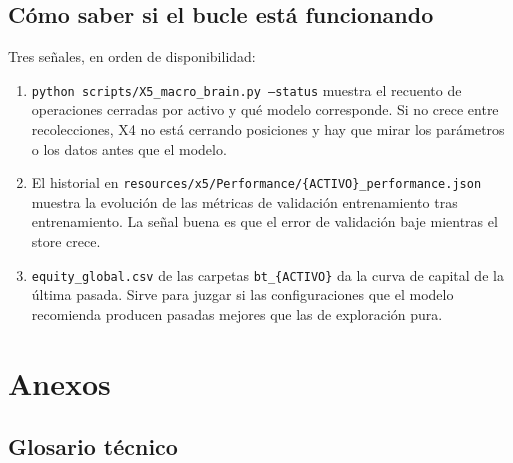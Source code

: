 \documentclass[11pt,a4paper]{article}
\newcommand{\code}[1]{\texttt{\small #1}}
\begin{document}
\subsection{Cómo saber si el bucle está funcionando}

Tres señales, en orden de disponibilidad:

\begin{enumerate}[leftmargin=1.6em,itemsep=2pt]
\item \code{python scripts/X5_macro_brain.py --status} muestra el recuento de operaciones
cerradas por activo y qué modelo corresponde. Si no crece entre recolecciones, X4 no está
cerrando posiciones y hay que mirar los parámetros o los datos antes que el modelo.
\item El historial en \code{resources/x5/Performance/\{ACTIVO\}_performance.json} muestra la
evolución de las métricas de validación entrenamiento tras entrenamiento. La señal buena es
que el error de validación baje mientras el store crece.
\item \code{equity_global.csv} de las carpetas \code{bt_\{ACTIVO\}} da la curva de capital de
la última pasada. Sirve para juzgar si las configuraciones que el modelo recomienda producen
pasadas mejores que las de exploración pura.
\end{enumerate}

\newpage

\section{Anexos}

\subsection{Glosario técnico}
\end{document}
